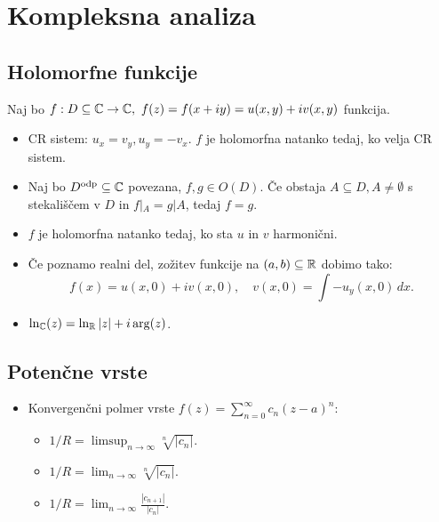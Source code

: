 \section{Kompleksna analiza}
\subsection{Holomorfne funkcije}
Naj bo \(f: D \subseteq \mathbb{C} \to \mathbb{C}, \ f(z) = f(x+iy) = u(x,y) + iv(x,y)\) funkcija.
\begin{itemize}
    \item CR sistem: \(u_x = v_y, u_y = - v_x\). \(f\) je holomorfna natanko tedaj, ko velja CR sistem.
    \item Naj bo \(D^\text{odp} \subseteq \mathbb{C}\) povezana, \(f, g \in O(D)\). Če obstaja \(A \subseteq D, A \neq \emptyset\) s stekališčem v \(D\) in \(f|_A = g|A\), tedaj \(f = g\).
    \item \(f\) je holomorfna natanko tedaj, ko sta \(u\) in \(v\) harmonični.
    \item Če poznamo realni del, zožitev funkcije na \((a,b) \subseteq \mathbb{R}\) dobimo tako: \[f(x) = u(x, 0) + iv(x,0), \quad v(x, 0) = \int -u_y(x,0) \, dx.\]
    \item \(\ln_{\mathbb{C}}(z) = \ln_{\mathbb{R}}|z| + i \arg (z)\).
\end{itemize}

\subsection{Potenčne vrste}
\begin{itemize}
    \item Konvergenčni polmer vrste \(f(z) = \sum_{n=0}^{\infty} c_n(z-a)^n\):
    \begin{itemize}
        \item \(1/R = \limsup_{n \to \infty} \sqrt[n]{|c_n|}\).
        \item \(1/R = \lim_{n \to \infty} \sqrt[n]{|c_n|}\).
        \item \(1/R = \lim_{n \to \infty} \frac{|c_{n+1}|}{|c_n|}\).
    \end{itemize}
\end{itemize}
